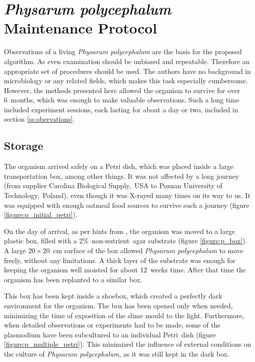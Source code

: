 \chapter{\textit{Physarum polycephalum} Maintenance Protocol}
\label{chapter:protocol}
Observations of a living \textit{Physarum polycephalum} are the basis for the proposed algorithm. As even examination should be unbiased and repeatable. Therefore an appropriate set of procedures should be used. The authors have no background in microbiology or any related fields, which makes this task especially cumbersome. However, the methods presented here allowed the organism to survive for over 6~months, which was enough to make valuable observations. Such a long time included experiment sessions, each lasting for about a day or two, included in section \ref{ss:obervations}.


\section*{Storage}

The organism arrived safely on a Petri dish, which was placed inside a large transportation box, among other things. It was not affected by a long journey (from supplier Carolina Biological Supply,~USA to Poznan University of Technology,~Poland), even though it was X-rayed many times on its way to us. It was equipped with enough oatmeal food sources to survive such a journey (figure \ref{figure:p_initial_petri}).

On the day of arrival, as per hints from \cite{adamatzky2010physarum}, the organism was moved to a large plastic box, filled with a 2\%~non-nutrient~agar substrate (figure \ref{figure:p_box}). A large $20\times20$~cm surface of the box allowed \textit{Physarum polycephalum} to move freely, without any limitations. A thick layer of the substrate was enough for keeping the organism well moisted for about 12~weeks time. After that time the organism has been replanted to a similar box.

This box has been kept inside a shoebox, which created a perfectly dark environment for the organism. The box has been opened only when needed, minimizing the time of exposition of the slime mould to the light. Furthermore, when detailed observations or experiments had to be made, some of the plasmodium have been subcultured to an individual Petri~dish (figure \ref{figure:p_multiple_petri}). This minimized the influence of external conditions on the culture of \textit{Physarum polycephalum}, as it was still kept in the dark box.

